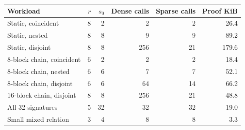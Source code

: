 \begin{tabular}{@{}lrrrrr@{}}
\toprule
Workload & $r$ & $s_0$ & Dense calls & Sparse calls & Proof KiB\\
\midrule
Static, coincident & 8 & 2 & 2 & 2 & 26.4\\
Static, nested & 8 & 8 & 9 & 9 & 89.2\\
Static, disjoint & 8 & 8 & 256 & 21 & 179.6\\
8-block chain, coincident & 6 & 2 & 2 & 2 & 18.4\\
8-block chain, nested & 6 & 6 & 7 & 7 & 52.1\\
8-block chain, disjoint & 6 & 6 & 64 & 14 & 66.2\\
16-block chain, disjoint & 8 & 8 & 256 & 21 & 48.8\\
All 32 signatures & 5 & 32 & 32 & 32 & 19.0\\
Small mixed relation & 3 & 4 & 8 & 8 & 3.3\\
\bottomrule
\end{tabular}
